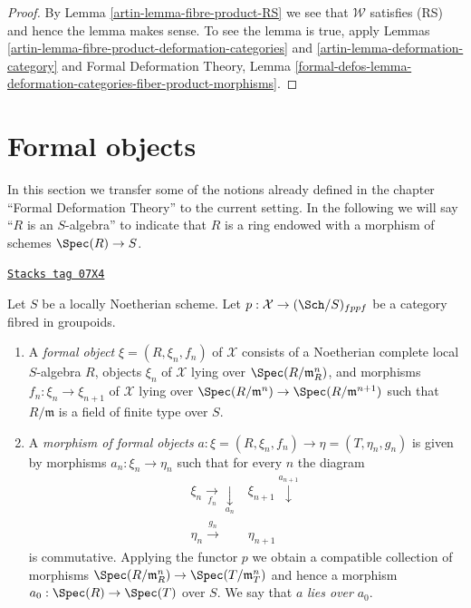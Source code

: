 \begin{proof}

By Lemma \ref{artin-lemma-fibre-product-RS} we see that $\mathcal{W}$
satisfies (RS) and hence the lemma makes sense. To see the lemma
is true, apply Lemmas \ref{artin-lemma-fibre-product-deformation-categories} and
\ref{artin-lemma-deformation-category}
and Formal Deformation Theory, Lemma
\ref{formal-defos-lemma-deformation-categories-fiber-product-morphisms}.
\end{proof}

\section{Formal objects}
\label{artin-section-formal-objects}
In this section we transfer some of the notions already defined
in the chapter ``Formal Deformation Theory'' to the current setting.
In the following we will say ``$R$ is an $S$-algebra'' to indicate
that $R$ is a ring endowed with a morphism of schemes $\Spec(R) \to S$.

\begin{definition}
\label{artin-definition-formal-objects}
\href{https://stacks.math.columbia.edu/tag/07X4}{\texttt{Stacks tag 07X4}}

Let $S$ be a locally Noetherian scheme. Let
$p : \mathcal{X} \to (\Sch/S)_{fppf}$ be a category fibred in groupoids.
\begin{enumerate}
\item A {\it formal object} $\xi = (R, \xi_n, f_n)$ of $\mathcal{X}$ consists
of a Noetherian complete local $S$-algebra $R$, objects $\xi_n$ of
$\mathcal{X}$ lying over $\Spec(R/\mathfrak m_R^n)$, and morphisms
$f_n : \xi_n \to \xi_{n + 1}$ of $\mathcal{X}$ lying over
$\Spec(R/\mathfrak m^n) \to \Spec(R/\mathfrak m^{n + 1})$
such that $R/\mathfrak m$ is a field of finite type over $S$.
\item A {\it morphism of formal objects}
$a : \xi = (R, \xi_n, f_n) \to \eta = (T, \eta_n, g_n)$
is given by morphisms $a_n : \xi_n \to \eta_n$ such that for every $n$
the diagram
$$
\begin{array}{cc}\xi_n \underset{f_n}{\longrightarrow}\underset{a_n}{\downarrow} & \xi_{n + 1} \overset{a_{n + 1}}{\downarrow} \\ \eta_n \overset{g_n}{\longrightarrow} & \eta_{n + 1}\end{array}
$$
is commutative. Applying the functor $p$ we obtain a compatible collection
of morphisms $\Spec(R/\mathfrak m_R^n) \to \Spec(T/\mathfrak m_T^n)$ and
hence a morphism $a_0 : \Spec(R) \to \Spec(T)$ over $S$. We say that
$a$ {\it lies over} $a_0$.
\end{enumerate}
\end{definition}

